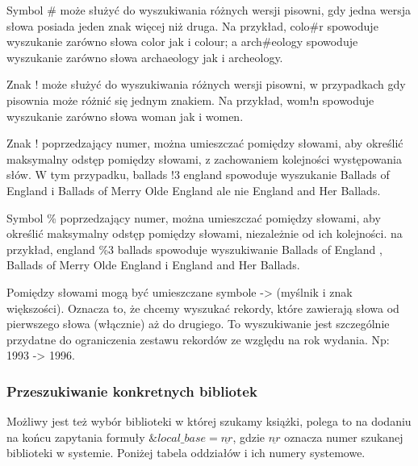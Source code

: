 \documentclass{report}
\begin{document}
				Symbol \# może służyć do wyszukiwania różnych wersji pisowni, gdy jedna wersja słowa posiada jeden znak więcej niż druga. Na przykład, colo\#r spowoduje wyszukanie zarówno słowa color jak i colour; a arch\#eology spowoduje wyszukanie zarówno słowa archaeology jak i archeology.
				
				Znak ! może służyć do wyszukiwania różnych wersji pisowni, w przypadkach gdy pisownia może różnić się jednym znakiem. Na przykład, wom!n spowoduje wyszukanie zarówno słowa woman jak i women.
				
				Znak ! poprzedzający numer, można umieszczać pomiędzy słowami, aby określić maksymalny odstęp pomiędzy słowami, z zachowaniem kolejności występowania słów. W tym przypadku, ballads !3 england spowoduje wyszukanie Ballads of England i Ballads of Merry Olde England ale nie England and Her Ballads.
				
				Symbol \% poprzedzający numer, można umieszczać pomiędzy słowami, aby określić maksymalny odstęp pomiędzy słowami, niezależnie od ich kolejności. na przykład, england \%3 ballads spowoduje wyszukiwanie Ballads of England , Ballads of Merry Olde England i England and Her Ballads.
				
				Pomiędzy słowami mogą być umieszczane symbole -> (myślnik i znak większości). Oznacza to, że chcemy wyszukać rekordy, które zawierają słowa od pierwszego słowa (włącznie) aż do drugiego. To wyszukiwanie jest szczególnie przydatne do ograniczenia zestawu rekordów ze względu na rok wydania. Np: 1993 -> 1996.
				
			\subsubsection{Przeszukiwanie konkretnych bibliotek}
				
				Możliwy jest też wybór biblioteki w której szukamy książki, polega to na dodaniu na końcu zapytania formuły $\&local\_base=\underline{nr}$, gdzie  $\underline{nr}$ oznacza numer szukanej biblioteki w systemie. Poniżej tabela oddziałów i ich numery systemowe.
				
\end{document}
